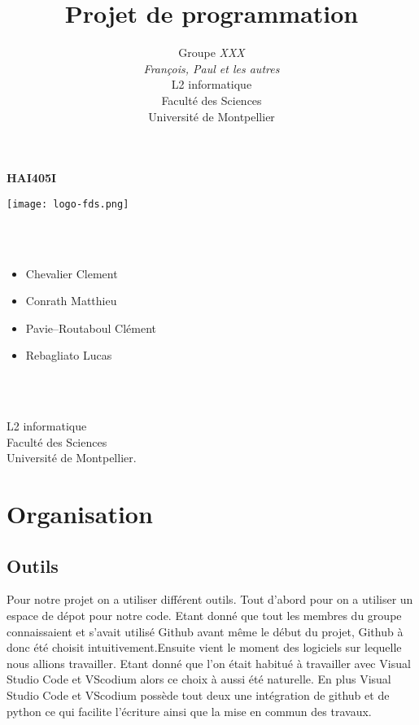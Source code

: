 \documentclass[a4paper, 12pt]{article}
\title{         %
  Projet de programmation}
\author{Groupe \emph{XXX}\\
  \emph{François, Paul et les autres}\\
    L2 informatique\\
  Faculté des Sciences\\
Université de Montpellier}
\begin{document}
\centerline{\Huge\bf HAI405I}
\vspace*{1.5cm}
\begin{center}               %
	
	
  \texttt{[image: logo-fds.png]}   %
	

\end{center}
\vspace*{1.5cm}


\vspace*{1.5cm}

\\ \\

\begin{itemize}\large
\item Chevalier Clement\large
\item Conrath Matthieu\large
\item Pavie--Routaboul Clément\large
\item Rebagliato Lucas\large
\end{itemize}
\\
\\
\vspace*{1.5cm}
\begin{center}
  L2 informatique\\
  Faculté des Sciences\\
Université de Montpellier.
\end{center}

\newpage

\section{Organisation}

\subsection{Outils}
Pour notre projet on a utiliser différent outils. Tout d'abord pour on a utiliser un espace de dépot pour notre code. Etant donné que tout les membres du groupe
connaissaient et s'avait utilisé Github avant même le début du projet, Github à donc été choisit intuitivement.Ensuite vient le moment des logiciels sur lequelle nous
allions travailler. Etant donné que l'on était habitué à travailler avec Visual Studio Code et VScodium alors ce choix à aussi été naturelle. En plus Visual Studio
Code et VScodium possède tout deux une intégration de github et de python ce qui facilite l'écriture ainsi que la mise en commun des travaux.
\end{document}
